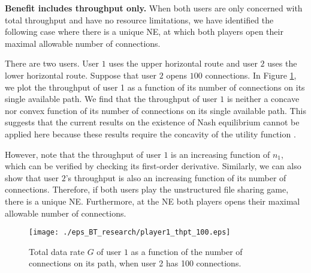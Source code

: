 \documentclass[conference]{IEEEtran}
\begin{document}
\bigskip
\noindent \textbf{Benefit includes throughput only.} When both
users are only concerned with total throughput and have no
resource limitations, we have identified the following case
where there is a unique NE, at which both players open their
maximal allowable number of connections.

There are two users. User $1$ uses the upper horizontal route and
user $2$ uses the lower horizontal route. Suppose that user $2$
opens $100$ connections. In Figure \ref{fig:thpt.p1.100}, we plot
the throughput of user 1 as a function of its number of
connections on its single available path.
We find that the throughput of user $1$ is neither a concave nor
convex function of its number of connections on its single
available path.  This suggests that the current results on the
existence of Nash equilibrium cannot be applied here because these
results require the concavity of the utility function
\cite{basar98game}\cite{rosen65}.

However, note that the throughput of user $1$ is an increasing
function of $n_1$, which can be verified by checking its
first-order derivative. Similarly, we can also show that
user $2$'s throughput is also an increasing function of its number
of connections. Therefore, if both users play the unstructured
file sharing game, there is a unique NE. Furthermore, at the NE
both players opens their maximal allowable number of connections.

\begin{figure}[htb]
    \begin{center}
\texttt{[image: ./eps\_BT\_research/player1\_thpt\_100.eps]}\\
        \caption{Total data rate $G$ of user $1$ as a function
        of the number of connections on its path, when user 2 has 100 connections.}
        \label{fig:thpt.p1.100}
     \end{center}
\end{figure}
\end{document}
